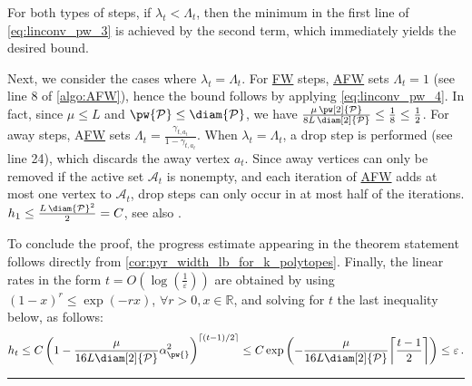 \documentclass{article}
\newcommand{\jmlrBlackBox}{\rule{1.5ex}{1.5ex}}
\newcommand{\jmlrQED}{\hfill\jmlrBlackBox\par\bigskip}
\providecommand{\proofname}{Proof}
\renewenvironment{proof}%
{%
 \par\noindent{\bfseries\upshape \proofname\ }%
}%
{\jmlrQED}
\newcommand{\mP}{\mathcal{P}}
\newcommand{\mA}{\mathcal{A}}
\let\epsilon\varepsilon
\newcommand\newlink[2]{\hyperlink{#1}{\normalcolor #2}}
\newcommand{\FW}{\newlink{def:acronym_frank_wolfe}{FW}}
\newcommand{\AFW}{\newlink{def:acronym_away_frank_wolfe}{AFW}}
\begin{document}
\begin{proof}
For both types of steps, if $\lambda_t < \Lambda_t$, then the minimum in the first line of \cref{eq:linconv_pw_3} is achieved by the second term, which immediately yields the desired bound.

Next, we consider the cases where $\lambda_t = \Lambda_t$.
For \FW{} steps, \AFW{} sets $\Lambda_t = 1$ (see line 8 of \cref{algo:AFW}), hence the bound follows by applying \cref{eq:linconv_pw_4}. In fact, since $\mu \le L$ and $\pw{\mP} \le \diam{\mP}$, we have $\frac{\mu\,\pw[2]{\mP}}{8L\,\diam[2]{\mP}} \le \frac{1}{8} \le \frac{1}{2}$.
For away steps, A\FW{} sets $\Lambda_t = \frac{\gamma_{t,a_t}}{1-\gamma_{t,a_t}}$.
When $\lambda_t = \Lambda_t$, a drop step is performed (see line 24), which discards the away vertex $a_t$.
Since away vertices can only be removed if the active set $\mA_t$ is nonempty, and each iteration of \AFW{} adds at most one vertex to $\mA_t$, drop steps can only occur in at most half of the iterations.
%
$h_1 \le \frac{L\,\diam{\mP}^2}{2} = C$, see also {\cite[Theorem 2.2]{BCC+23}}.

To conclude the proof, the progress estimate appearing in the theorem statement follows directly from \cref{cor:pyr_width_lb_for_k_polytopes}.
Finally, the linear rates in the form $t = O(\log\left(\frac{1}{\epsilon}\right))$ are obtained by using  $(1-x)^r \le \exp(-rx)$, $\forall r > 0, x \in \mathbb{R}$, and solving for $t$ the last inequality below, as follows:
\[
h_t
\leq C \left(1 - \frac{\mu}{16L\diam[2]{\mP}}\alpha_{\pw{}}^2\right)^{\lceil (t-1)/2 \rceil}
\le
C \exp\left(- \frac{\mu}{16L\diam[2]{\mP}} {\left\lceil \frac{t-1}{2} \right\rceil}\right)
\le \epsilon\,.
\]
\end{proof}
%
%
%
%
%
%
%
%
%
%
\end{document}
